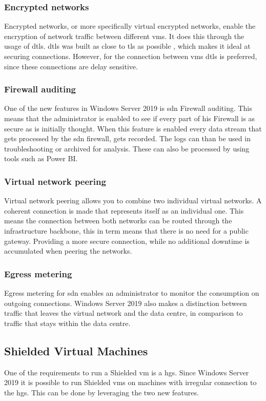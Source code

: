 \subsubsection{Encrypted networks}
Encrypted networks, or more specifically virtual encrypted networks, enable the encryption of network traffic between different \acrlong{vm}s. It does this through the usage of \acrfull{dtls}. \acrshort{dtls} was built as close to \acrshort{tls} as possible \autocite{Modadugu2004}, which makes it ideal at securing connections. However, for the connection between \acrlong{vm}s \acrshort{dtls} is preferred, since these connections are delay sensitive. 

\subsubsection{Firewall auditing}
One of the new features in Windows Server 2019 is \acrshort{sdn} Firewall auditing. This means that the administrator is enabled to see if every part of his Firewall is as secure as is initially thought. When this feature is enabled every data stream that gets processed by the \acrshort{sdn} firewall, gets recorded. The logs can than be used in troubleshooting or archived for analysis. These can also be processed by using tools such as Power BI.

\subsubsection{Virtual network peering}
Virtual network peering allows you to combine two individual virtual networks. A coherent connection is made that represents itself as an individual one. This means the connection between both networks can be routed through the infrastructure backbone, this in term means that there is no need for a public gateway. Providing a more secure connection, while no additional downtime is accumulated when peering the networks.

\subsubsection{Egress metering}
Egress metering for \acrshort{sdn} enables an administrator to monitor the consumption on outgoing connections. Windows Server 2019 also makes a distinction between traffic that leaves the virtual network and the data centre, in comparison to traffic that stays within the data centre. 

\subsection{Shielded Virtual Machines}
One of the requirements to run a Shielded \acrfull{vm} is a \acrfull{hgs}. Since Windows Server 2019 it is possible to run Shielded \acrshort{vm}s on machines with irregular connection to the \acrshort{hgs}. This can be done by leveraging the two new features. 

